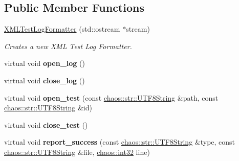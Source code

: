 \subsection*{Public Member Functions}
\begin{DoxyCompactItemize}
\item 
\hypertarget{classchaos_1_1test_1_1log__formatter_1_1_x_m_l_test_log_formatter_afeb917496071ad57ba6bc9fd766e1060}{}\hyperlink{classchaos_1_1test_1_1log__formatter_1_1_x_m_l_test_log_formatter_afeb917496071ad57ba6bc9fd766e1060}{X\+M\+L\+Test\+Log\+Formatter} (std\+::ostream $\ast$stream)\label{classchaos_1_1test_1_1log__formatter_1_1_x_m_l_test_log_formatter_afeb917496071ad57ba6bc9fd766e1060}

\begin{DoxyCompactList}\small\item\em Creates a new X\+M\+L Test Log Formatter. \end{DoxyCompactList}\item 
\hypertarget{classchaos_1_1test_1_1log__formatter_1_1_x_m_l_test_log_formatter_a4103c24daf83bff69ad23ba4a7d7e2ad}{}virtual void {\bfseries open\+\_\+log} ()\label{classchaos_1_1test_1_1log__formatter_1_1_x_m_l_test_log_formatter_a4103c24daf83bff69ad23ba4a7d7e2ad}

\item 
\hypertarget{classchaos_1_1test_1_1log__formatter_1_1_x_m_l_test_log_formatter_a5eed2684e7c75ac55f18417d675d3e5a}{}virtual void {\bfseries close\+\_\+log} ()\label{classchaos_1_1test_1_1log__formatter_1_1_x_m_l_test_log_formatter_a5eed2684e7c75ac55f18417d675d3e5a}

\item 
\hypertarget{classchaos_1_1test_1_1log__formatter_1_1_x_m_l_test_log_formatter_a75659e6702e789ad344c061ab65a89c5}{}virtual void {\bfseries open\+\_\+test} (const \hyperlink{classchaos_1_1str_1_1_u_t_f8_string}{chaos\+::str\+::\+U\+T\+F8\+String} \&path, const \hyperlink{classchaos_1_1str_1_1_u_t_f8_string}{chaos\+::str\+::\+U\+T\+F8\+String} \&id)\label{classchaos_1_1test_1_1log__formatter_1_1_x_m_l_test_log_formatter_a75659e6702e789ad344c061ab65a89c5}

\item 
\hypertarget{classchaos_1_1test_1_1log__formatter_1_1_x_m_l_test_log_formatter_a7887aa75de5772511a8f2d3274514343}{}virtual void {\bfseries close\+\_\+test} ()\label{classchaos_1_1test_1_1log__formatter_1_1_x_m_l_test_log_formatter_a7887aa75de5772511a8f2d3274514343}

\item 
\hypertarget{classchaos_1_1test_1_1log__formatter_1_1_x_m_l_test_log_formatter_a31fba9826f0283816e7ae49be8518e8b}{}virtual void {\bfseries report\+\_\+success} (const \hyperlink{classchaos_1_1str_1_1_u_t_f8_string}{chaos\+::str\+::\+U\+T\+F8\+String} \&type, const \hyperlink{classchaos_1_1str_1_1_u_t_f8_string}{chaos\+::str\+::\+U\+T\+F8\+String} \&file, \hyperlink{namespacechaos_ad1de7efb430365afd2c9446a0f522a90}{chaos\+::int32} line)\label{classchaos_1_1test_1_1log__formatter_1_1_x_m_l_test_log_formatter_a31fba9826f0283816e7ae49be8518e8b}


\end{DoxyCompactItemize}
